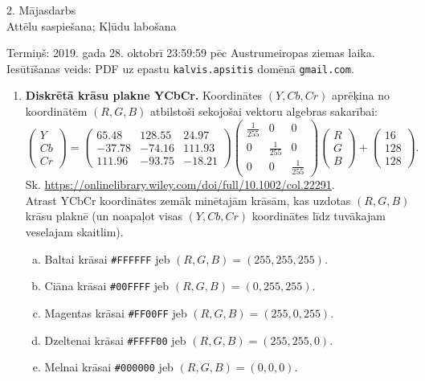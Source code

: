 \documentclass[a4paper]{article}
\begin{document}


\begin{center}
{\Large 2. Mājasdarbs}\\
{\Large Attēlu saspiešana; Kļūdu labošana}
\end{center}

Termiņš: 2019. gada 28. oktobrī 23:59:59 pēc Austrumeiropas ziemas laika.\\
Iesūtīšanas veids: PDF uz epastu {\tt kalvis.apsitis} domēnā {\tt gmail.com}.


\begin{enumerate}
\item {\bf Diskrētā krāsu plakne YCbCr.} 
Koordinātes $(Y,Cb,Cr)$ aprēķina no koordinātēm $(R,G,B)$ atbilstoši 
sekojošai vektoru algebras sakarībai:
$$\left( \begin{array}{c}
Y\\
Cb\\
Cr
\end{array} \right) = \left( \begin{array}{ccc}
65.48 & 128.55 & 24.97\\
-37.78 & -74.16 & 111.93\\
111.96 & -93.75 & -18.21
\end{array} \right) \left( \begin{array}{ccc}
\frac{1}{255} & 0 & 0\\
0 & \frac{1}{255} & 0\\
0 & 0 & \frac{1}{255}
\end{array} \right) 
\left( \begin{array}{c}
R\\
G\\
B
\end{array} \right) + \left( \begin{array}{c}
16\\
128\\
128
\end{array} \right).$$
Sk. \url{https://onlinelibrary.wiley.com/doi/full/10.1002/col.22291}.\\
Atrast YCbCr koordinātes zemāk minētajām krāsām, kas uzdotas $(R,G,B)$ krāsu plaknē
(un noapaļot visas $(Y,Cb,Cr)$ koordinātes līdz tuvākajam veselajam skaitlim). 
\begin{enumerate}[(a)]
\item Baltai krāsai {\tt \#FFFFFF} jeb $(R,G,B) = (255,255,255)$. 
\item Ciāna krāsai  {\tt \#00FFFF} jeb $(R,G,B) = (0,255,255)$.
\item Magentas krāsai {\tt \#FF00FF} jeb $(R,G,B) = (255,0,255)$. 
\item Dzeltenai krāsai {\tt \#FFFF00} jeb $(R,G,B) = (255,255,0)$. 
\item Melnai krāsai  {\tt \#000000} jeb $(R,G,B) = (0,0,0)$.
\end{enumerate}


\end{enumerate}
\end{document}
